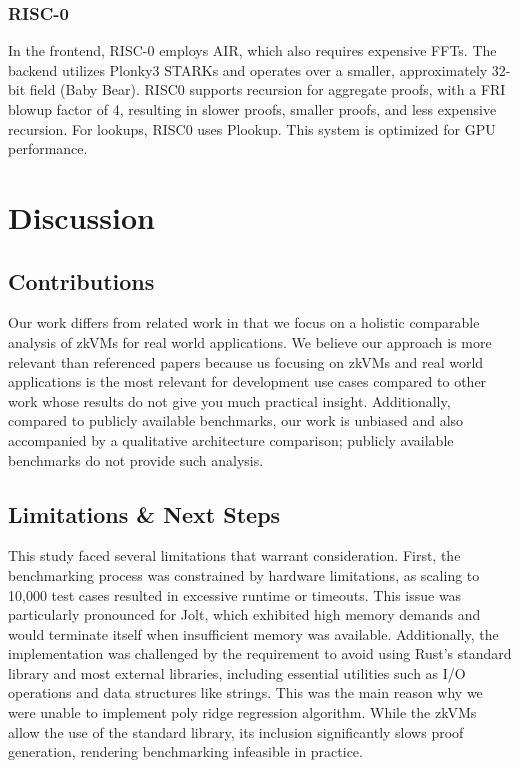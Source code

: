 \documentclass{scrartcl}
\begin{document}
\subsubsection{RISC-0}
In the frontend, RISC-0 employs AIR, which also requires expensive FFTs. The backend utilizes Plonky3 STARKs and operates over a smaller, approximately 32-bit field (Baby Bear). RISC0 supports recursion for aggregate proofs, with a FRI blowup factor of 4, resulting in slower proofs, smaller proofs, and less expensive recursion. For lookups, RISC0 uses Plookup. This system is optimized for GPU performance.

\section{Discussion}
%

\subsection{Contributions}
Our work differs from related work in that we focus on a holistic comparable analysis of zkVMs for real world applications. We believe our approach is more relevant than referenced papers because us focusing on zkVMs and real world applications is the most relevant for development use cases compared to other work whose results do not give you much practical insight. Additionally, compared to publicly available benchmarks, our work is unbiased and also accompanied by a qualitative architecture comparison; publicly available benchmarks do not provide such analysis.

\subsection{Limitations \& Next Steps}
This study faced several limitations that warrant consideration. First, the benchmarking process was constrained by hardware limitations, as scaling to 10,000 test cases resulted in excessive runtime or timeouts. This issue was particularly pronounced for Jolt, which exhibited high memory demands and would terminate itself when insufficient memory was available. Additionally, the implementation was challenged by the requirement to avoid using Rust’s standard library and most external libraries, including essential utilities such as I/O operations and data structures like strings. This was the main reason why we were unable to implement poly ridge regression algorithm. While the zkVMs allow the use of the standard library, its inclusion significantly slows proof generation, rendering benchmarking infeasible in practice.
\end{document}
